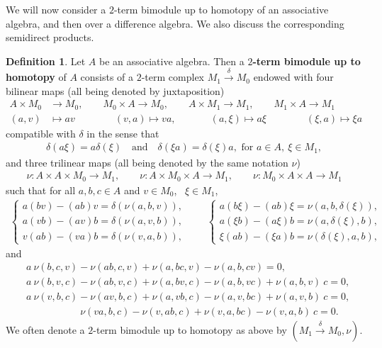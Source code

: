 \documentclass[a4paper,reqno,10pt]{amsart}
\theoremstyle{plain}
\theoremstyle{definition}
\newtheorem{defn}[thm]{Definition}
\theoremstyle{remark}
\begin{document}
We will now consider a $2$-term bimodule up to homotopy of an associative algebra, and then over a difference algebra. We also discuss the corresponding semidirect products.

\begin{defn}
    Let $A$ be an associative algebra. Then a {\bf $2$-term bimodule up to homotopy} of $A$ consists of a $2$-term complex $M_1 \xrightarrow{\delta} M_0$ endowed with four bilinear maps (all being denoted by juxtaposition)
    \begin{align*}
        A \times M_0 &\rightarrow M_0, \qquad M_0 \times A \rightarrow M_0, \qquad A \times M_1 \rightarrow M_1, \qquad M_1 \times A \rightarrow M_1 \\
        (a, v) & \mapsto av \quad \qquad \quad (v, a) \mapsto va, ~~ \quad \quad \quad (a, \xi) \mapsto a \xi \qquad \qquad (\xi, a) \mapsto \xi a
    \end{align*}
    compatible with $\delta$ in the sense that
    \begin{align}
        \delta (a \xi) = a \delta (\xi) ~~~ \text{ and } ~~~ \delta (\xi a) = \delta (\xi) a, \text{ for } a \in A, ~ \! \xi \in M_1,
    \end{align}
    and three trilinear maps (all being denoted by the same notation $\nu$)
    \begin{align*}
        \nu: A \times A \times M_0 \rightarrow M_1, \qquad \nu : A \times M_0 \times A \rightarrow M_1, \qquad \nu : M_0 \times A \times A \rightarrow M_1 
    \end{align*}
    such that for all $a, b, c \in A$ and $v \in M_0$, ~$\xi \in M_1$,
    \begin{align*}
\begin{cases}
    a (b v) - (ab) v = \delta (\nu (a, b, v)),\\
    a ( v b) - (a v) b = \delta (\nu (a, v, b)),\\
    v (a b) - (v a) b = \delta (\nu (v, a, b)),
\end{cases}
\qquad 
\begin{cases}
    a (b \xi) - (a b) \xi = \nu (a, b, \delta (\xi)), \\
    a (\xi b) - (a \xi) b = \nu (a, \delta (\xi), b), \\
    \xi (a b) - (\xi a) b = \nu (\delta (\xi), a, b),
\end{cases}
    \end{align*}
    and
    \begin{align}
        &a ~ \! \nu (b,c, v) - \nu (ab, c, v) + \nu (a, bc, v) - \nu (a, b, c v) = 0, \label{id-nu1}\\
        &a ~  \! \nu (b, v, c) - \nu (ab, v, c) + \nu (a, bv, c) - \nu (a, b, v c) + \nu (a, b, v) ~ \! c = 0, \label{id-nu2}\\
        & a ~ \! \nu (v, b, c) - \nu (a v, b, c) + \nu (a, v b, c) - \nu (a, v, bc) + \nu (a, v, b) ~ \! c =0, \label{id-nu3}\\
        & ~ ~ \qquad \qquad \quad \nu (v a, b, c) - \nu (v, ab, c) + \nu (v, a, b c) - \nu (v, a, b) ~ \! c = 0. \label{id-nu4}
    \end{align}
    We often denote a $2$-term bimodule up to homotopy as above by $(M_1 \xrightarrow{\delta} M_0, \nu)$.
\end{defn}
\end{document}
